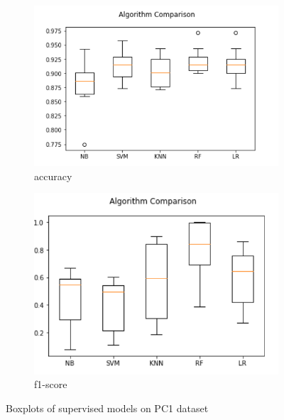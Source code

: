\begin{figure}[h!]
  \centering
  \begin{subfigure}[b]{0.4\linewidth}
    \includegraphics[width=\linewidth]{report/PC1.png}
    \caption{accuracy}
  \end{subfigure}
  \begin{subfigure}[b]{0.4\linewidth}
    \includegraphics[width=\linewidth]{report/PC1_f.png}
    \caption{f1-score}
  \end{subfigure}
  \caption{Boxplots of supervised models on PC1 dataset}
\end{figure}

